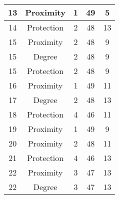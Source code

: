 \documentclass[results.tex]{subfiles}
\begin{document}
\begin{center}
\begin{tabular}{| c || c | c | c | c |}
            \hline
            13                      & Proximity                    & 1                      & 49                      & 5                    \\
            \hline
            14                      & Protection                   & 2                      & 48                      & 13                   \\
            \hline
            15                      & Proximity                    & 2                      & 48                      & 9                    \\
            \hline
            15                      & Degree                       & 2                      & 48                      & 9                    \\
            \hline
            15                      & Protection                   & 2                      & 48                      & 9                    \\
            \hline
            16                      & Proximity                    & 1                      & 49                      & 11                   \\
            \hline
            17                      & Degree                       & 2                      & 48                      & 13                   \\
            \hline
            18                      & Protection                   & 4                      & 46                      & 11                   \\
            \hline
            19                      & Proximity                    & 1                      & 49                      & 9                    \\
            \hline
            20                      & Proximity                    & 2                      & 48                      & 11                   \\
            \hline
            21                      & Protection                   & 4                      & 46                      & 13                   \\
            \hline
            22                      & Proximity                    & 3                      & 47                      & 13                   \\
            \hline
            22                      & Degree                       & 3                      & 47                      & 13                   \\

\end{tabular}
\end{center}
\end{document}
